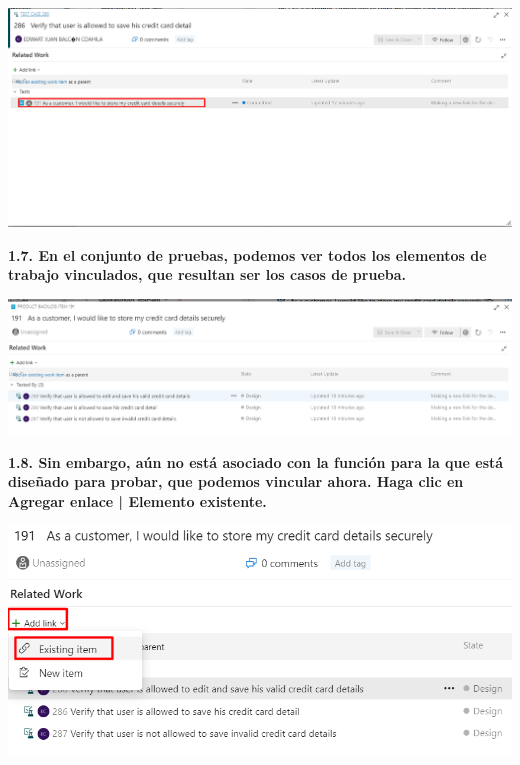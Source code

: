 \documentclass{article}
\begin{document}
    \begin{center}
		\includegraphics[width=14cm]{./images/1.6} 
	\end{center}
	
\newpage
\textbf{1.7. 
En el conjunto de pruebas, podemos ver todos los elementos de trabajo vinculados, que resultan ser los casos de prueba.}

    \begin{center}
		\includegraphics[width=14cm]{./images/1.7} 
	\end{center}
		
\textbf{1.8. Sin embargo, aún no está asociado con la función para la que está diseñado para probar, que podemos vincular ahora. Haga clic en Agregar enlace | Elemento existente.}

    \begin{center}
		\includegraphics[width=14cm]{./images/1.8} 
	\end{center}
	
\newpage
	
\end{document}
